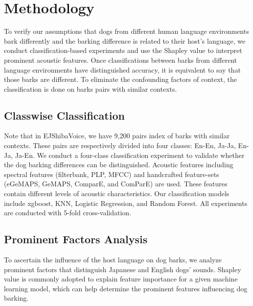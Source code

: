 \section{Methodology}
\label{sec:method}
To verify our assumptions that dogs from different human language environments bark differently and the barking difference is related to their host's language, we conduct classification-based experiments and use the Shapley value to interpret prominent acoustic features. Once classifications between barks from different language environments have distinguished accuracy, it is equivalent to say that those barks are different. To eliminate the confounding factors of context, the classification is done on barks pairs with similar contexts.

\subsection{Classwise Classification}
Note that in EJShibaVoice, we have 9,200 pairs index of barks with similar contexts. These pairs are respectively divided into four classes: En-En, Ja-Ja, En-Ja, Ja-En. We conduct a four-class classification experiment to validate whether the dog barking differences can be distinguished. Acoustic features including spectral features (filterbank, PLP, MFCC) and handcrafted feature-sets (eGeMAPS, GeMAPS, ComparE, and ComParE) are used. These features contain different levels of acoustic characteristics. Our classification models include xgboost, KNN, Logistic Regression, and Random Forest. All experiments are conducted with 5-fold cross-validation. 

\subsection{Prominent Factors Analysis}


To ascertain the influence of the host language on dog barks, we analyze prominent factors that distinguish Japanese and English dogs' sounds. Shapley value is commonly adopted to explain feature importance for a given machine learning model, which can help determine the prominent features influencing dog barking. %

